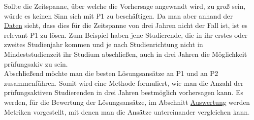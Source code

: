 Sollte die Zeitspanne, \"uber welche die Vorhersage angewandt wird, zu gro{\ss} sein, w\"urde es keinen Sinn sich mit P1 zu besch\"aftigen.
Da man aber anhand der \hyperref[sec:daten]{Daten} sieht, dass dies f\"ur
die Zeitspanne von drei Jahren nicht der Fall ist, ist es relevant P1 zu l\"osen. Zum Beispiel haben jene Studierende, die in ihr erstes oder zweites Studienjahr kommen und je nach Studienrichtung
nicht in Mindeststudienzeit ihr Studium abschlie{\ss}en, auch in drei Jahren die M\"oglichkeit pr\"ufungsakiv zu sein. \\

Abschlie{\ss}end m\"ochte man die besten L\"osungsans\"atze an P1 und an P2 zusammenf\"uhren. Somit wird eine Methode formuliert, wie man
die Anzahl der pr\"ufungsaktiven Studierenden in drei Jahren bestm\"oglich vorhersagen kann. Es werden, f\"ur die Bewertung der L\"osungsans\"atze,
im Abschnitt \hyperref[sec:auswertung]{Auswertung} werden Metriken vorgestellt, mit denen man die Ans\"atze untereinander vergleichen kann.